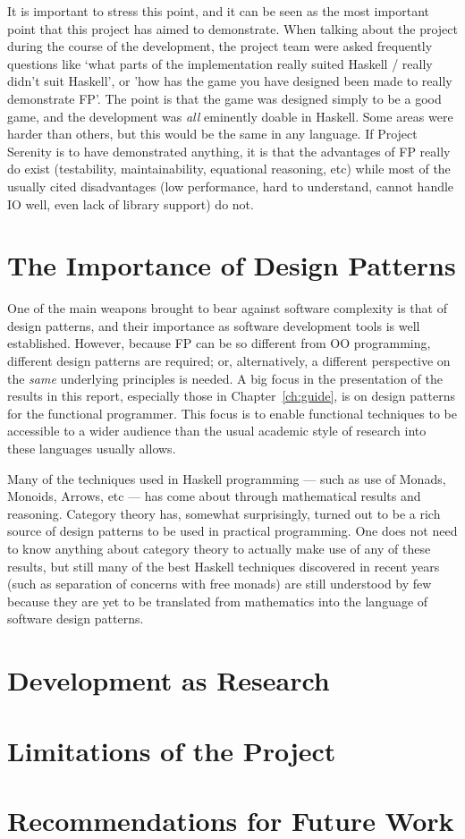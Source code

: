 It is important to stress this point, and it can be seen as the most important point that this project has aimed to demonstrate. When talking about the project during the course of the development, the project team were asked frequently questions like `what parts of the implementation really suited Haskell / really didn't suit Haskell', or 'how has the game you have designed been made to really demonstrate FP'. The point is that the game was designed simply to be a good game, and the development was \emph{all} eminently doable in Haskell. Some areas were harder than others, but this would be the same in any language. If Project Serenity is to have demonstrated anything, it is that the advantages of FP really do exist (testability, maintainability, equational reasoning, etc) while most of the usually cited disadvantages (low performance, hard to understand, cannot handle IO well, even lack of library support) do not.

\section{The Importance of Design Patterns}

One of the main weapons brought to bear against software complexity is that of design patterns, and their importance as software development tools is well established. However, because FP can be so different from OO programming, different design patterns are required; or, alternatively, a different perspective on the \emph{same} underlying principles is needed. A big focus in the presentation of the results in this report, especially those in Chapter~\ref{ch:guide}, is on design patterns for the functional programmer. This focus is to enable functional techniques to be accessible to a wider audience than the usual academic style of research into these languages usually allows.

Many of the techniques used in Haskell programming --- such as use of Monads, Monoids, Arrows, etc --- has come about through mathematical results and reasoning. Category theory has, somewhat surprisingly, turned out to be a rich source of design patterns to be used in practical programming. One does not need to know anything about category theory to actually make use of any of these results, but still many of the best Haskell techniques discovered in recent years (such as separation of concerns with free monads) are still understood by few because they are yet to be translated from mathematics into the language of software design patterns.

\section{Development as Research}

\section{Limitations of the Project}

\section{Recommendations for Future Work}

